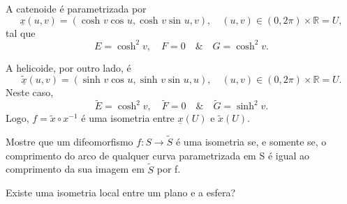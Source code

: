 \documentclass[../differential_geometry.tex]{subfiles}
\begin{document}
\begin{example}
	A catenoide é parametrizada por
	\[
		\underline{x}(u, v) = (\cosh^{}{v}\cos^{}{u}, \cosh^{}{v}\sin^{}{u}, v), \quad (u, v)\in (0, 2\pi )\times \mathbb{R} = U,
	\]
	tal que
	\[
		E = \cosh^{2}{v},\quad  F = 0 \quad\&\quad G = \cosh^{2}{v}.
	\]

	A helicoide, por outro lado, é
	\[
		\underline{\tilde{x}}(u, v) = (\sinh^{}{v}\cos^{}{u}, \sinh^{}{v}\sin^{}{u}, u), \quad (u, v)\in (0, 2\pi )\times \mathbb{R} = U.
	\]
	Neste caso,
	\[
		\tilde{E}=\cosh^{2}{v},\quad \tilde{F} = 0 \quad\&\quad \tilde{G} = \sinh^{2}{v}.
	\]
	Logo, \(f=\tilde{x}\circ x^{-1}\) é uma isometria entre \(\underline{x}(U)\) e \(\tilde{x}(U)\).
\end{example}
\begin{exr}
	Mostre que um difeomorfismo \(f:S\rightarrow \tilde{S}\) é uma isometria se, e somente se, o comprimento do arco de qualquer curva parametrizada em S é igual ao comprimento da sua imagem em \(\tilde{S}\) por f.
\end{exr}
\begin{exr}
	Existe uma isometria local entre um plano e a esfera?
\end{exr}
\end{document}

